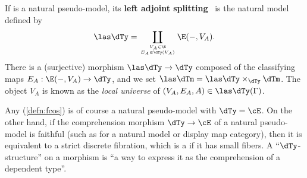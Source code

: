 \begin{eg}\label{eg:las}
  If \E is a natural pseudo-model, its \textbf{left adjoint splitting}~\cite{lw:localuniv} is the natural model defined by
  \[ \las\dTy = \coprod_{V_A\in \E \atop E_A \in \dTy(V_A)} \E(-,V_A). \]
  There is a (surjective) morphism $\las\dTy\to \dTy$ composed of the classifying maps $E_A : \E(-,V_A) \to \dTy$, and we set $\las\dTm = \las\dTy \times_{\dTy} \dTm$.
  The object $V_A$ is known as the \emph{local universe} of $(V_A,E_A,A) \in \las\dTy(\Gamma)$.
\end{eg}

\begin{rmk}
  Any \nfs (\cref{defn:fcos}) is of course a natural pseudo-model with $\dTy=\cE$.
  On the other hand, if the comprehension morphism $\dTy\to\cE$ of a natural pseudo-model is faithful (such as for a natural model or display map category), then it is equivalent to a strict discrete fibration, which is a \nfs if it has small fibers.
  A ``$\dTy$-structure'' on a morphism is ``a way to express it as the comprehension of a dependent type''.
\end{rmk}

